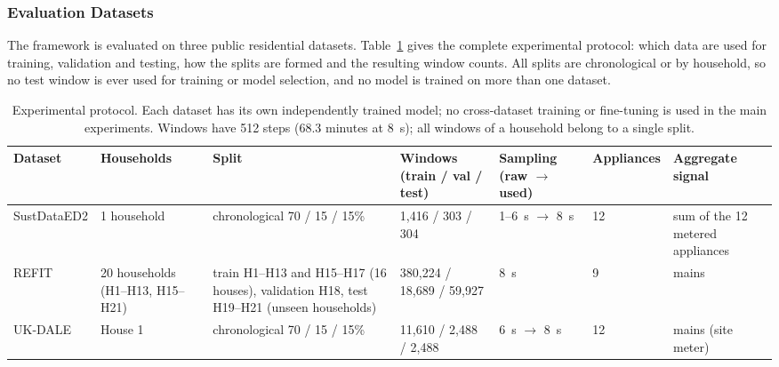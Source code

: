 \documentclass[fleqn,10pt]{wlscirep}
\begin{document}
\subsubsection{Evaluation Datasets}
\label{subsubsec:datasets}

The framework is evaluated on three public residential datasets. Table~\ref{tab:protocol} gives the complete experimental protocol: which data are used for training, validation and testing, how the splits are formed and the resulting window counts. All splits are chronological or by household, so no test window is ever used for training or model selection, and no model is trained on more than one dataset.

\begin{table}[!t]
\centering
\caption{Experimental protocol. Each dataset has its own independently trained model; no cross-dataset training or fine-tuning is used in the main experiments. Windows have 512 steps (68.3 minutes at 8~s); all windows of a household belong to a single split.}
\label{tab:protocol}
\footnotesize
\begin{adjustbox}{max width=\textwidth}\begin{tabular}{@{}p{1.9cm}p{2.6cm}p{2.7cm}p{1.8cm}p{2.6cm}p{2.3cm}p{2.3cm}@{}}
\toprule
Dataset & Households & Split & Windows (train / val / test) & Sampling (raw $\rightarrow$ used) & Appliances & Aggregate signal \\
\midrule
SustDataED2 & 1 household & chronological 70 / 15 / 15\% & 1,416 / 303 / 304 & 1--6~s $\rightarrow$ 8~s & 12 & sum of the 12 metered appliances \\
REFIT & 20 households (H1--H13, H15--H21) & train H1--H13 and H15--H17 (16 houses), validation H18, test H19--H21 (unseen households) & 380,224 / 18,689 / 59,927 & 8~s & 9 & mains \\
UK-DALE & House 1 & chronological 70 / 15 / 15\% & 11,610 / 2,488 / 2,488 & 6~s $\rightarrow$ 8~s & 12 & mains (site meter) \\
\bottomrule
\end{tabular}\end{adjustbox}
\end{table}
\end{document}
